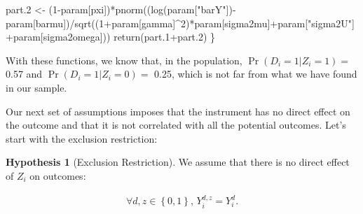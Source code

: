 \documentclass[
]{book}
\newenvironment{Shaded}{\begin{snugshade}}{\end{snugshade}}
\newcommand{\DecValTok}[1]{\textcolor[rgb]{0.00,0.00,0.81}{#1}}
\newcommand{\FloatTok}[1]{\textcolor[rgb]{0.00,0.00,0.81}{#1}}
\newcommand{\FunctionTok}[1]{\textcolor[rgb]{0.00,0.00,0.00}{#1}}
\newcommand{\NormalTok}[1]{#1}
\newcommand{\OtherTok}[1]{\textcolor[rgb]{0.56,0.35,0.01}{#1}}
\newcommand{\SpecialCharTok}[1]{\textcolor[rgb]{0.00,0.00,0.00}{#1}}
\newcommand{\StringTok}[1]{\textcolor[rgb]{0.31,0.60,0.02}{#1}}
\theoremstyle{definition}
\theoremstyle{definition}
\theoremstyle{definition}
\theoremstyle{definition}
\newtheorem{hypothesis}{Hypothesis}[chapter]
\theoremstyle{remark}
\begin{document}
\begin{Shaded}
\begin{Highlighting}[]
\NormalTok{  part}\FloatTok{.2} \OtherTok{\textless{}{-}}\NormalTok{ (}\DecValTok{1}\SpecialCharTok{{-}}\NormalTok{param[}\StringTok{\textquotesingle{}pxi\textquotesingle{}}\NormalTok{])}\SpecialCharTok{*}\FunctionTok{pnorm}\NormalTok{((}\FunctionTok{log}\NormalTok{(param[}\StringTok{"barY"}\NormalTok{])}\SpecialCharTok{{-}}\NormalTok{param[}\StringTok{\textquotesingle{}barmu\textquotesingle{}}\NormalTok{])}\SpecialCharTok{/}\FunctionTok{sqrt}\NormalTok{((}\DecValTok{1}\SpecialCharTok{+}\NormalTok{param[}\StringTok{\textquotesingle{}gamma\textquotesingle{}}\NormalTok{]}\SpecialCharTok{\^{}}\DecValTok{2}\NormalTok{)}\SpecialCharTok{*}\NormalTok{param[}\StringTok{\textquotesingle{}sigma2mu\textquotesingle{}}\NormalTok{]}\SpecialCharTok{+}\NormalTok{param[}\StringTok{"sigma2U"}\NormalTok{]}\SpecialCharTok{+}\NormalTok{param[}\StringTok{\textquotesingle{}sigma2omega\textquotesingle{}}\NormalTok{]))}
  \FunctionTok{return}\NormalTok{(part}\FloatTok{.1}\SpecialCharTok{+}\NormalTok{part}\FloatTok{.2}\NormalTok{)}
\NormalTok{\}}
\end{Highlighting}
\end{Shaded}

With these functions, we know that, in the population, \(\Pr(D_i=1|Z_i=1)=\) 0.57 and \(\Pr(D_i=1|Z_i=0)=\) 0.25, which is not far from what we have found in our sample.

Our next set of assumptions imposes that the instrument has no direct effect on the outcome and that it is not correlated with all the potential outcomes.
Let's start with the exclusion restriction:

\begin{hypothesis}[Exclusion Restriction]
\protect\hypertarget{hyp:ExclusionRestriction}{}{\label{hyp:ExclusionRestriction} \iffalse (Exclusion Restriction) \fi{} }We assume that there is no direct effect of \(Z_i\) on outcomes:

\begin{align*}
\forall d,z \in \left\{0,1\right\}\text{, } Y_i^{d,z} = Y_i^d.
\end{align*}
\end{hypothesis}
\end{document}
